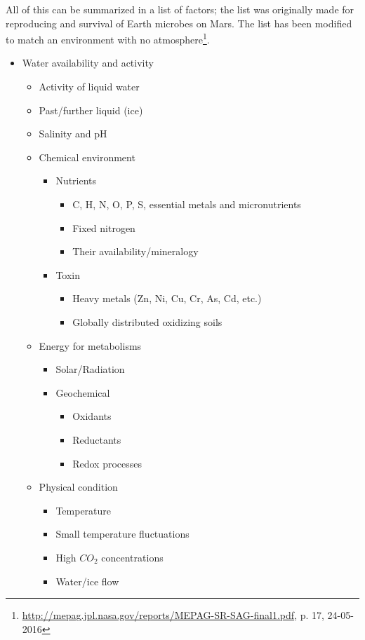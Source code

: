 All of this can be summarized in a list of factors; the list was originally made for reproducing and survival of Earth microbes on Mars. The list has been modified to match an environment with no atmosphere\footnote{\url{http://mepag.jpl.nasa.gov/reports/MEPAG-SR-SAG-final1.pdf}, p. 17, 24-05-2016}.
\begin{itemize}
  \item Water availability and activity
  \begin{itemize}
    \item Activity of liquid water
    \item Past/further liquid (ice)
    \item Salinity and pH
  \end{itemize}
  \begin{itemize}
    \item  Chemical environment
    \begin{itemize}
      \item Nutrients
      \begin{itemize}
        \item C, H, N, O, P, S, essential metals and micronutrients
        \item Fixed nitrogen
        \item Their availability/mineralogy
      \end{itemize}
      \item Toxin
      \begin{itemize}
        \item Heavy metals (Zn, Ni, Cu, Cr, As, Cd, etc.)
        \item Globally distributed oxidizing soils
      \end{itemize}
    \end{itemize}
  \end{itemize}
  \begin{itemize}
    \item  Energy for metabolisms
    \begin{itemize}
      \item Solar/Radiation
      \item Geochemical
      \begin{itemize}
        \item Oxidants
        \item Reductants
        \item Redox processes
      \end{itemize}
    \end{itemize}
  \end{itemize}
  \begin{itemize}
    \item Physical condition
    \begin{itemize}
      \item Temperature
      \item Small temperature fluctuations
      \item High $CO_2$ concentrations
      \item Water/ice flow
    \end{itemize}
  \end{itemize}
\end{itemize}
